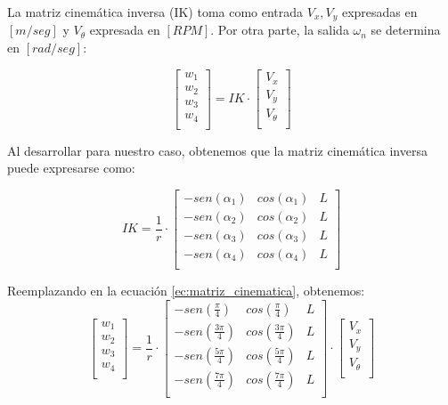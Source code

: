 La matriz cinemática inversa (IK) toma como entrada $V_x, V_y$ expresadas en $[m/seg]$ y $V_\theta$ expresada en $[RPM]$. Por otra parte, la salida $\omega_n$ se determina en $[rad/seg]$:

\begin{equation}
	\begin{bmatrix} w_1 \\ w_2 \\ w_3 \\ w_4 \\ \end{bmatrix} = IK \cdot \begin{bmatrix} V_x \\ V_y \\ V_\theta \\ \end{bmatrix}
\end{equation}

Al desarrollar para nuestro caso, obtenemos que la matriz cinemática inversa puede expresarse como:

\begin{equation}
	IK =
	\frac{1}{r}
	\cdot
	\begin{bmatrix}
    	{-sen(\alpha_1)} & {cos(\alpha_1)} & L \\
    	{-sen(\alpha_2)} & {cos(\alpha_2)} & L \\
    	{-sen(\alpha_3)} & {cos(\alpha_3)} & L \\
    	{-sen(\alpha_4)} & {cos(\alpha_4)} & L \\
	\end{bmatrix}
	\label{ec:matriz_cinematica}
\end{equation}

Reemplazando en la ecuación \ref{ec:matriz_cinematica}, obtenemos:
\begin{equation}
	\begin{bmatrix}
    	w_1 \\ w_2 \\ w_3 \\ w_4 \\
	\end{bmatrix} = \frac{1}{r} \cdot
	\begin{bmatrix}
    	{-sen(\frac{\pi}{4})} & {cos( \frac{\pi}{4})} & L \\
    	{-sen(\frac{3\pi}{4})} & {cos(\frac{3\pi}{4})} & L \\
    	{-sen(\frac{5\pi}{4})} & {cos(\frac{5\pi}{4})} & L \\
    	{-sen(\frac{7\pi}{4})} & {cos(\frac{7\pi}{4})} & L \\
	\end{bmatrix} \cdot
	\begin{bmatrix} V_x \\ V_y \\ V_\theta \\
	\end{bmatrix}
\end{equation}

